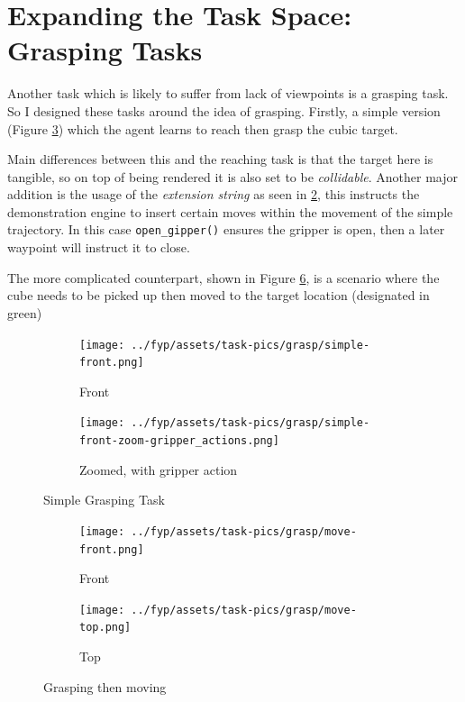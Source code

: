 \section{Expanding the Task Space: Grasping Tasks}
Another task which is likely to suffer from lack of viewpoints is a grasping task. So I designed these tasks around the idea of grasping. Firstly, a simple version (Figure \ref{fig:grasp-simple}) which the agent learns to reach then grasp the cubic target. 

Main differences between this and the reaching task is that the target here is tangible, so on top of being rendered it is also set to be \emph{collidable}. Another major addition is the usage of the \emph{extension string} as seen in \ref{subfig:simple-zoom-actions}, this instructs the demonstration engine to insert certain moves within the movement of the simple trajectory. In this case \verb|open_gipper()| ensures the gripper is open, then a later waypoint will instruct it to close.


The more complicated counterpart, shown in Figure \ref{fig:grasp-move}, is a scenario where the cube needs to be picked up then moved to the target location (designated in green)

\begin{figure}[htpb] %
  \centering
  \begin{subfigure}{0.3\linewidth}
    \centering
    \texttt{[image: ../fyp/assets/task-pics/grasp/simple-front.png]}
    \caption{Front}\label{subfig:simple-front}
  \end{subfigure}
  \hfill
  \begin{subfigure}{0.5\linewidth}
    \centering
    \texttt{[image: ../fyp/assets/task-pics/grasp/simple-front-zoom-gripper\_actions.png]}
    \caption{Zoomed, with gripper action}\label{subfig:simple-zoom-actions}
  \end{subfigure}
  \caption{Simple Grasping Task}\label{fig:grasp-simple}
\end{figure}

\begin{figure}[htpb] %
  \centering
  \begin{subfigure}{0.45\linewidth}
    \centering
    \texttt{[image: ../fyp/assets/task-pics/grasp/move-front.png]} 
    \caption{Front}\label{subfig:grasp-move-front}
  \end{subfigure}
  \hfill
  \begin{subfigure}{0.45\linewidth}
    \centering
    \texttt{[image: ../fyp/assets/task-pics/grasp/move-top.png]}
    \caption{Top}\label{subfig:grasp-move-top}
  \end{subfigure}
  \caption{Grasping then moving}\label{fig:grasp-move}
\end{figure}



